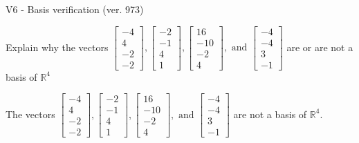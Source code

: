 \begin{exercise}
  \begin{exerciseTitle}V6 - Basis verification (ver. 973)\end{exerciseTitle}
  \begin{exerciseStatement}
    Explain why the vectors \(\left[\begin{array}{r}
-4 \\
4 \\
-2 \\
-2
\end{array}\right] , \left[\begin{array}{r}
-2 \\
-1 \\
4 \\
1
\end{array}\right] , \left[\begin{array}{r}
16 \\
-10 \\
-2 \\
4
\end{array}\right] , \text{ and } \left[\begin{array}{r}
-4 \\
-4 \\
3 \\
-1
\end{array}\right]\) are or are not a basis of \(\mathbb{R}^4\)	


  \end{exerciseStatement}
  \begin{exerciseAnswer}
   The vectors \(\left[\begin{array}{r}
-4 \\
4 \\
-2 \\
-2
\end{array}\right] , \left[\begin{array}{r}
-2 \\
-1 \\
4 \\
1
\end{array}\right] , \left[\begin{array}{r}
16 \\
-10 \\
-2 \\
4
\end{array}\right] , \text{ and } \left[\begin{array}{r}
-4 \\
-4 \\
3 \\
-1
\end{array}\right]\) 
  	 are not  a basis of \(\mathbb{R}^4\).
  


  \end{exerciseAnswer}
\end{exercise}